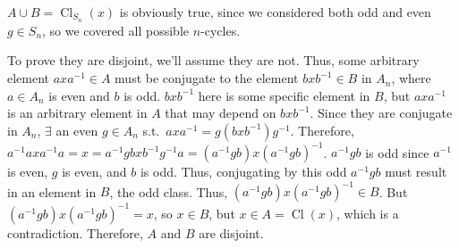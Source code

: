 \documentclass[fleqn]{article}
\DeclareMathOperator{\Cl}{Cl}
\begin{document}
            $A \cup B = \Cl_{S_n}(x)$ is obviously true, since we considered both odd and even $g \in S_n$, so we covered all possible $n$-cycles.
            
            To prove they are disjoint, we'll assume they are not.  Thus, some arbitrary element $axa^{-1} \in A$ must be conjugate to the element $bxb^{-1} \in B$ in $A_n$, where $a \in A_n$ is even and $b$ is odd.  $bxb^{-1}$ here is some specific element in $B$, but $axa^{-1}$ is an arbitrary element in $A$ that may depend on $bxb^{-1}$.  Since they are conjugate in $A_n$, $\exists$ an even $g \in A_n$ s.t.\ $axa^{-1} = g(bxb^{-1})g^{-1}$.  Therefore, $a^{-1}axa^{-1}a = x = a^{-1}gbxb^{-1}g^{-1}a = (a^{-1}gb)x(a^{-1}gb)^{-1}$.  $a^{-1}gb$ is odd since $a^{-1}$ is even, $g$ is even, and $b$ is odd.  Thus, conjugating by this odd $a^{-1}gb$ must result in an element in $B$, the odd class.  Thus, $(a^{-1}gb)x(a^{-1}gb)^{-1} \in B$.  But $(a^{-1}gb)x(a^{-1}gb)^{-1} = x$, so $x \in B$, but $x \in A = \Cl(x)$, which is a contradiction.  Therefore, $A$ and $B$ are disjoint.
            
\end{document}
